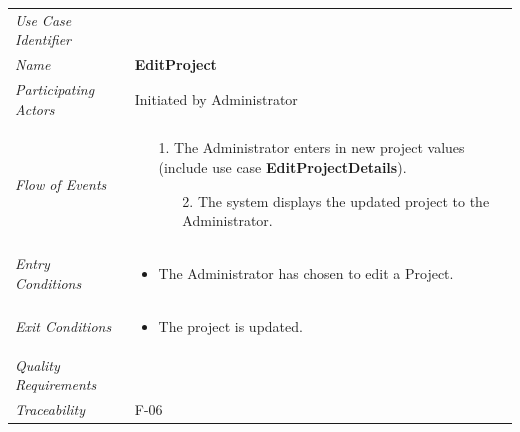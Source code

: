 \documentclass[12pt,letterpaper]{article}
\begin{document}
\begin{center}
	\begin{tabu} to 
		\toprule
		Use Case Identifier & \editproject{} \\
		Name & {\bf EditProject} \\
		Participating Actors & Initiated by Administrator \\
		Flow of Events & 
		\begin{minipage}[t]{\linewidth}
		    \begin{enumerate}
		        \item[1.] The Administrator enters in new project values (include use case \textbf{EditProjectDetails}).
			    \begin{enumerate}
			        \item[2.] The system displays the updated project to the Administrator.
			    \end{enumerate}
			\end{enumerate}
		\end{minipage} \\

		Entry Conditions &
		\begin{minipage}[t]{\linewidth}
			\begin{itemize}
			    \item The Administrator has chosen to edit a Project.
	        \end{itemize}
		\end{minipage} \\

		Exit Conditions &
        \begin{minipage}[t]{\linewidth}
			\begin{itemize}
			    \item The project is updated.
	        \end{itemize}
		\end{minipage} \\

		Quality Requirements & \\

		Traceability & F-06 \\
		\toprule
	\end{tabu}
\end{center}
\end{document}
